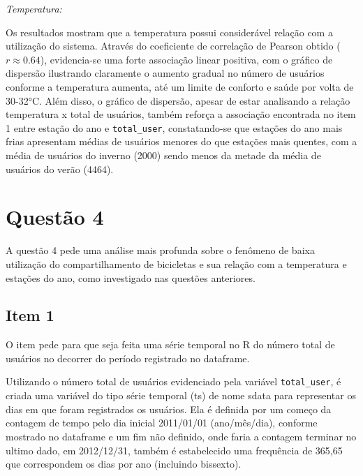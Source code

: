 \documentclass[a4paper, 12pt, titlepage]{article}
\begin{document}
\textit{Temperatura:}

Os resultados mostram que a temperatura possui considerável relação com a utilização do sistema. Através do coeficiente de correlação de Pearson obtido ($r \approx 0.64$), evidencia-se uma forte associação linear positiva, com o gráfico de dispersão ilustrando claramente o aumento gradual no número de usuários conforme a temperatura aumenta, até um limite de conforto e saúde por volta de 30-32°C. Além disso, o gráfico de dispersão, apesar de estar analisando a relação temperatura x total de usuários, também reforça a associação encontrada no item 1 entre estação do ano e \texttt{total\_user}, constatando-se que estações do ano mais frias apresentam médias de usuários menores do que estações mais quentes, com a média de usuários do inverno (2000) sendo menos da metade da média de usuários do verão (4464).

\section*{Questão 4}

A questão 4 pede uma análise mais profunda sobre o fenômeno de baixa utilização do compartilhamento de bicicletas e sua relação com a temperatura e estações do ano, como investigado nas questões anteriores.

\subsection*{Item 1}
O item pede para que seja feita uma série temporal no R do número total de usuários no decorrer do período registrado no dataframe. 

Utilizando o número total de usuários evidenciado pela variável \texttt{total\_user}, é criada uma variável do tipo série temporal (ts) de nome sdata para representar os dias em que foram registrados os usuários. Ela é definida por um começo da contagem de tempo pelo dia inicial 2011/01/01 (ano/mês/dia), conforme mostrado no dataframe e um fim não definido, onde faria a contagem terminar no ultimo dado, em 2012/12/31, também é estabelecido uma frequência de 365,65 que correspondem os dias por ano (incluindo bissexto).
\end{document}
